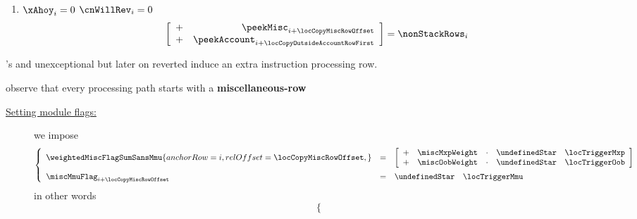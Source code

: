 \begin{description}
\begin{description}
\begin{enumerate}
						\[
							\left[ \begin{array}{cr}
								+ & \peekMisc      _{i + \locCopyMiscRowOffset           } \\
								+ & \peekAccount   _{i + \locCopyOutsideAccountRowFirst  } \\
								+ & \peekAccount   _{i + \locCopyOutsideAccountRowSecond } \\
							\end{array} \right]
							= \nonStackRows_{i}
						\]
					\item \If $\xAhoy_{i} = 0$ \et $\cnWillRev_{i} = 0$ \Then
						\[
							\left[ \begin{array}{cr}
								+ & \peekMisc      _{i + \locCopyMiscRowOffset          } \\
								+ & \peekAccount   _{i + \locCopyOutsideAccountRowFirst } \\
							\end{array} \right]
							= \nonStackRows_{i}
						\]
				\end{enumerate}
				\saNote{} \oogxSH{}'s and unexceptional but later on reverted  induce an extra instruction processing row.
		\end{description}
	\item[\underline{\underline{Setting the miscellaneous-row $n^°(i + \locCopyMiscRowOffset)$:}}]
		observe that every processing path starts with a \textbf{miscellaneous-row}
		\begin{description}
			\item[\underline{Setting module flags:}]
				we impose
				\[
					\left\{ \begin{array}{lcl}
						\weightedMiscFlagSumSansMmu {
							anchorRow = i                     ,
							relOffset = \locCopyMiscRowOffset ,
						}
						& = &
						\left[ \begin{array}{clcl}
							+ & \miscMxpWeight & \cdot & \undefinedStar \quad \locTriggerMxp \\
							+ & \miscOobWeight & \cdot & \undefinedStar \quad \locTriggerOob \\
						\end{array} \right]
						\vspace{2mm} \\
						\miscMmuFlag  _{i + \locCopyMiscRowOffset} & = & \undefinedStar \quad \locTriggerMmu \\
					\end{array} \right.
				\]
				in other words
				\[
					\left\{ \begin{array}{lclr}

\end{array}\]
\end{description}
\end{description}
